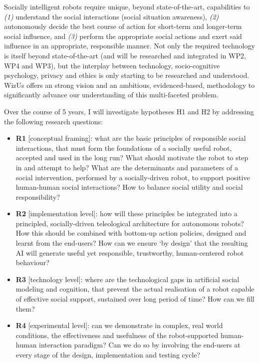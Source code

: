 \documentclass[11pt,a4paper]{report}
\newcommand{\project}{WizUs\xspace}
\begin{document}
Socially intelligent robots require unique, beyond state-of-the-art,
capabilities to \emph{(1)} understand the social interactions (social
situation awareness), \emph{(2)} autonomously decide the best course of action for
short-term and longer-term social influence, and \emph{(3)} perform the
appropriate social actions and exert said influence in an appropriate,
responsible manner.
Not only the required technology is itself beyond state-of-the-art (and will be
researched and integrated in WP2, WP4 and WP3), but the
interplay between technology, socio-cognitive psychology, privacy and ethics is
only starting to be researched and understood. \project offers an
strong vision and an ambitious, evidenced-based, methodology to significantly
advance our understanding of this multi-faceted problem.

Over the course of 5 years, I will investigate hypotheses H1 and H2
by addressing the following research questions:

\begin{itemize}
    \item \textbf{R1} [conceptual framing]: what are the basic principles of
        responsible social interactions, that must form the foundations of a
        socially useful robot, accepted and used in the long run? What should
        motivate the robot to step in and attempt to help? What are the
        determinants and parameters of a social intervention, performed by a
        socially-driven robot, to support positive human-human social
        interactions? How to balance social utility and social responsibility?

    \item \textbf{R2} [implementation level]: how will these principles
        be integrated into a principled, socially-driven teleological
        architecture for autonomous robots? How this should be combined with
        bottom-up action policies, designed and learnt from the end-users? How
        can we ensure `by design' that the resulting AI will generate useful yet
        responsible, trustworthy, human-centered robot behaviour?

    \item \textbf{R3} [technology level]: where are the technological gaps in
        artificial social modeling and cognition, that prevent the actual
        realisation of a robot capable of effective social support, sustained
        over long period of time? How can we fill them?

    \item \textbf{R4} [experimental level]: can we demonstrate in complex, real
        world conditions, the effectiveness and usefulness of the
        robot-supported human-human interaction paradigm? Can we do so by
        involving the end-users at every stage of the design, implementation and
        testing cycle?

\end{itemize}
\end{document}
